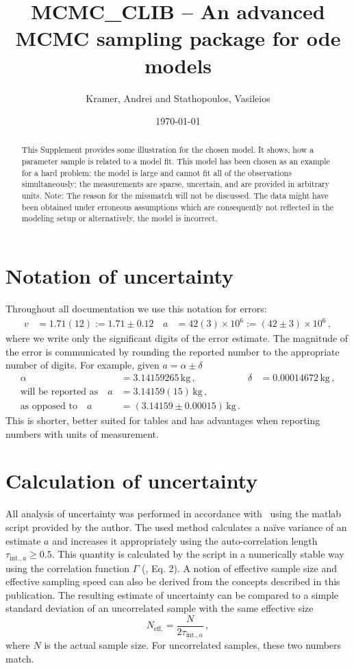 \documentclass[english]{scrartcl}
\author{Kramer, Andrei and Stathopoulos, Vasileios}
\title{MCMC\_CLIB -- An
advanced MCMC sampling package for ode models}
\date{\today}
\begin{document}
\maketitle
\begin{abstract}
  This Supplement provides some illustration for the chosen model. It
  shows, how a parameter sample is related to a model fit. This model
  has been chosen as an example for a hard problem: the model is large
  and cannot fit all of the observations simultaneously; the
  measurements are sparse, uncertain, and are provided in arbitrary
  units. Note: The reason for the missmatch will not be discussed. The
  data might have been obtained under erroneous assumptions which are
  consequently not reflected in the modeling setup or alternatively,
  the model is incorrect.
\end{abstract}
\section{Notation of uncertainty}
Throughout all documentation we use this notation for errors:
\begin{align}
  \label{eq:errn}
  v&=1.71(12):=1.71 \pm 0.12\, & a&=42(3)\times 10^6:=(42 \pm 3)\times 10^6\,,
\end{align}
where we write only the significant digits of the error estimate. The
magnitude of the error is communicated by rounding the reported number
to the appropriate number of digits. For example, given $a=\alpha \pm \delta$
\begin{align}
  \alpha&=3.14159265\,\text{kg}\,,&\delta&=0.00014672\,\text{kg}\,,\\
  \text{will be reported as}\quad a&=3.14159(15)\,\text{kg}\,,\\
  \text{as opposed to}\quad a&=(3.14159\pm0.00015)\,\text{kg}\,.
\end{align}
This is shorter, better suited for tables and has advantages when
reporting numbers with units of measurement.

\section{Calculation of uncertainty}
\label{sec:UWerr}

All analysis of uncertainty was performed in accordance with~\cite{UWerr}
using the matlab script provided by the author. The used method
calculates a naïve variance of an estimate $a$ and increases it
appropriately using the auto-correlation length
$\tau_{\text{int.},a} \ge 0.5$. This quantity is calculated by the script in a
numerically stable way using the correlation function $\Gamma$
(\cite{UWerr}, Eq. 2). A notion of effective sample size and effective
sampling speed can also be derived from the concepts described in this
publication. The resulting estimate of uncertainty can be compared to
a simple standard deviation of an uncorrelated sample with the same
effective size
\begin{equation}
  \label{eq:Neff}
  N_{\text{eff.}}=\frac{N}{2\tau_{\text{int.},a}}\,,
\end{equation}
where $N$ is the actual sample size. For uncorrelated samples, these
two numbers match.
\end{document}
